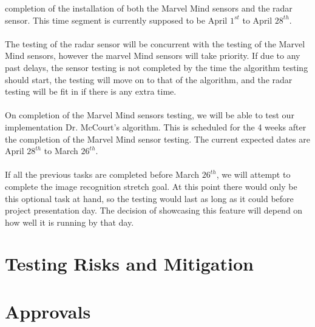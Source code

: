 \documentclass[english,12pt]{article}
\begin{document}
completion of the installation of both the Marvel Mind sensors and the radar sensor. This time 
segment is currently supposed to be April $1^{st}$ to April $28^{th}$.\\\\
The testing of the radar sensor will be concurrent with the testing of the Marvel Mind sensors, 
however the marvel Mind sensors will take priority. If due to any past delays, the sensor testing 
is not completed by the time the algorithm testing should start, the testing will move on to that 
of the algorithm, and the radar testing will be fit in if there is any extra time.\\\\
On completion of the Marvel Mind sensors testing, we will be able to test our implementation 
Dr. McCourt’s algorithm. This is scheduled for the 4 weeks after the completion of the Marvel 
Mind sensor testing. The current expected dates are April $28^{th}$ to March $26^{th}$.\\\\
If all the previous tasks are completed before March $26^{th}$, we will attempt to complete the image 
recognition stretch goal. At this point there would only be this optional task at hand, so the 
testing would last as long as it could before project presentation day. The decision of showcasing 
this feature will depend on how well it is running by that day.
\section{Testing Risks and Mitigation}

\section{Approvals}
\end{document}
